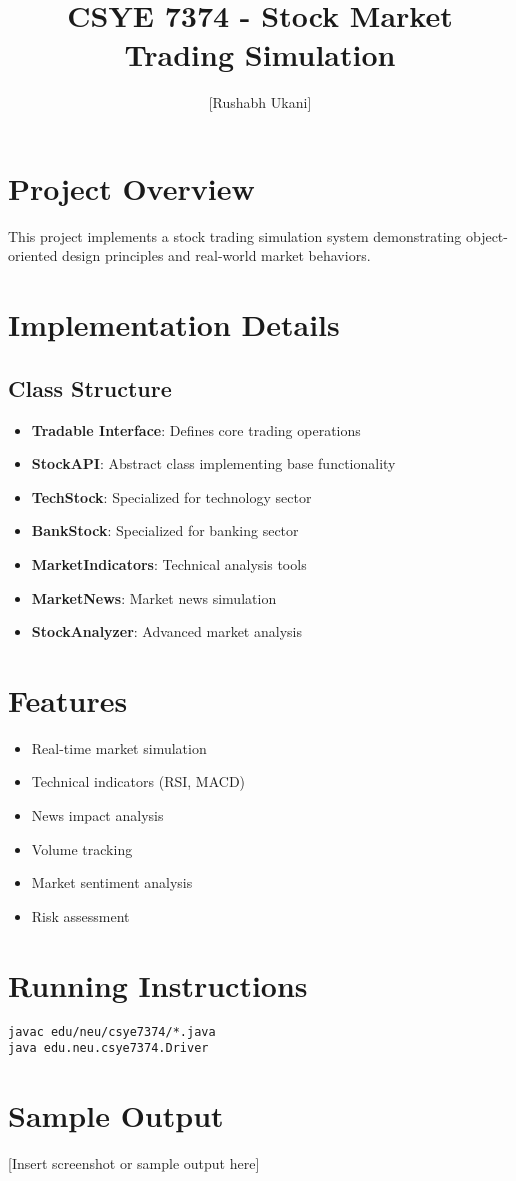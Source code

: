 \documentclass{article}
\title{CSYE 7374 - Stock Market Trading Simulation}
\author{[Rushabh Ukani]}
\begin{document}
\maketitle

\section{Project Overview}
This project implements a stock trading simulation system demonstrating object-oriented design principles and real-world market behaviors.

\section{Implementation Details}
\subsection{Class Structure}
\begin{itemize}
    \item \textbf{Tradable Interface}: Defines core trading operations
    \item \textbf{StockAPI}: Abstract class implementing base functionality
    \item \textbf{TechStock}: Specialized for technology sector
    \item \textbf{BankStock}: Specialized for banking sector
    \item \textbf{MarketIndicators}: Technical analysis tools
    \item \textbf{MarketNews}: Market news simulation
    \item \textbf{StockAnalyzer}: Advanced market analysis
\end{itemize}

\section{Features}
\begin{itemize}
    \item Real-time market simulation
    \item Technical indicators (RSI, MACD)
    \item News impact analysis
    \item Volume tracking
    \item Market sentiment analysis
    \item Risk assessment
\end{itemize}

\section{Running Instructions}
\begin{verbatim}
javac edu/neu/csye7374/*.java
java edu.neu.csye7374.Driver
\end{verbatim}

\section{Sample Output}
[Insert screenshot or sample output here]
\end{document}
